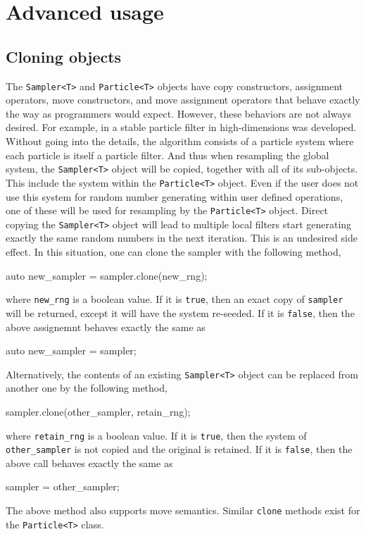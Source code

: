 \chapter{Advanced usage}
\label{chap:Advanced usage}

\section{Cloning objects}
\label{sec:Cloning objects}

The \verb|Sampler<T>| and \verb|Particle<T>| objects have copy constructors,
assignment operators, move constructors, and move assignment operators that
behave exactly the way as \cpp programmers would expect. However, these
behaviors are not always desired. For example, in \textcite{stpf} a stable
particle filter in high-dimensions was developed. Without going into the
details, the algorithm consists of a particle system where each particle is
itself a particle filter. And thus when resampling the global system, the
\verb|Sampler<T>| object will be copied, together with all of its sub-objects.
This include the \rng system within the \verb|Particle<T>| object. Even if the
user does not use this \rng system for random number generating within user
defined operations, one of these \rng will be used for resampling by the
\verb|Particle<T>| object. Direct copying the \verb|Sampler<T>| object will
lead to multiple local filters start generating exactly the same random numbers
in the next iteration. This is an undesired side effect. In this situation, one
can clone the sampler with the following method,
\begin{cppcode}
  auto new_sampler = sampler.clone(new_rng);
\end{cppcode}
where \verb|new_rng| is a boolean value. If it is \verb|true|, then an exact
copy of \verb|sampler| will be returned, except it will have the \rng system
re-seeded. If it is \verb|false|, then the above assignemnt behaves exactly the
same as
\begin{cppcode}
  auto new_sampler = sampler;
\end{cppcode}
Alternatively, the contents of an existing \verb|Sampler<T>| object can be
replaced from another one by the following method,
\begin{cppcode}
  sampler.clone(other_sampler, retain_rng);
\end{cppcode}
where \verb|retain_rng| is a boolean value. If it is \verb|true|, then the \rng
system of \verb|other_sampler| is not copied and the original is retained. If
it is \verb|false|, then the above call behaves exactly the same as
\begin{cppcode}
  sampler = other_sampler;
\end{cppcode}
The above method also supports move semantics. Similar \verb|clone| methods
exist for the \verb|Particle<T>| class.

